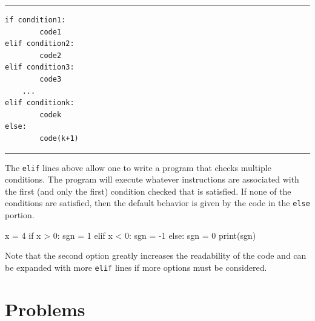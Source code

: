 \documentclass{ximera}
\begin{document}
\noindent\rule{\textwidth}{1pt}
\begin{verbatim}
if condition1:
        code1
elif condition2:
        code2
elif condition3:
        code3
    ...
elif conditionk:
        codek
else:
        code(k+1)
\end{verbatim}
\noindent\rule{\textwidth}{1pt}

The \verb|elif| lines above allow one to write a program that checks multiple conditions. The program will execute whatever instructions are associated with the first (and only the first) condition checked that is satisfied. If none of the conditions are satisfied, then the default behavior is given by the code in the \verb|else| portion.

\begin{sageCell}
x = 4
if x > 0:
        sgn = 1
elif x < 0:
        sgn = -1
else:
        sgn = 0
print(sgn)
\end{sageCell}

Note that the second option greatly increases the readability of the code and can be expanded with more \verb|elif| lines if more options must be considered.

\section{Problems}
\end{document}
